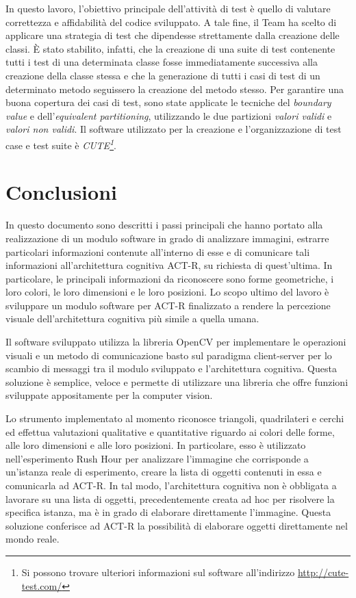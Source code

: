 		In questo lavoro, l'obiettivo principale dell'attività di test è quello di valutare correttezza e affidabilità del codice sviluppato.
		A tale fine, il Team ha scelto di applicare una strategia di test che dipendesse strettamente dalla creazione delle classi.
		È stato stabilito, infatti, che la creazione di una suite di test contenente tutti i test di una determinata classe fosse immediatamente successiva alla creazione della classe stessa e che la generazione di tutti i casi di test di un determinato metodo seguissero la creazione del metodo stesso.
		Per garantire una buona copertura dei casi di test, sono state applicate le tecniche del \emph{boundary value} e dell'\emph{equivalent partitioning}, utilizzando le due partizioni \emph{valori validi} e \emph{valori non validi}.
		Il software utilizzato per la creazione e l'organizzazione di test case e test suite è \emph{CUTE\footnote{Si possono trovare ulteriori informazioni sul software all'indirizzo \url{http://cute-test.com/}}}.
		

	\section*{Conclusioni}
		In questo documento sono descritti i passi principali che hanno portato alla realizzazione di un modulo software in grado di analizzare immagini, estrarre particolari informazioni contenute all'interno di esse e di comunicare tali informazioni all'architettura cognitiva \mbox{ACT-R}, su richiesta di quest'ultima.
		In particolare, le principali informazioni da riconoscere sono	forme geometriche, i loro colori, le loro dimensioni e le loro posizioni.
		Lo scopo ultimo del lavoro è sviluppare un modulo software per \mbox{ACT-R} finalizzato a rendere la percezione visuale dell'architettura cognitiva più simile a quella umana.

		Il software sviluppato utilizza la libreria \mbox{OpenCV} per implementare le operazioni visuali e un metodo di comunicazione basto sul paradigma client-server per lo scambio di messaggi tra il modulo sviluppato e l'architettura cognitiva. 
		Questa soluzione è semplice, veloce e permette di utilizzare una libreria che offre funzioni sviluppate appositamente per la computer vision.

		Lo strumento implementato al momento riconosce triangoli, quadrilateri e cerchi ed effettua valutazioni qualitative e quantitative riguardo ai colori delle forme, alle loro dimensioni e alle loro posizioni.
		In particolare, esso è utilizzato nell'esperimento Rush Hour per analizzare l'immagine che corrisponde a un'istanza reale di esperimento, creare la lista di oggetti contenuti in essa e comunicarla ad \mbox{ACT-R}.
		In tal modo, l'architettura cognitiva non è obbligata a lavorare su una lista di oggetti, precedentemente creata ad hoc per risolvere la specifica istanza, ma è in grado di elaborare direttamente l'immagine. 
		Questa soluzione conferisce ad \mbox{ACT-R} la possibilità di elaborare oggetti direttamente nel mondo reale.

